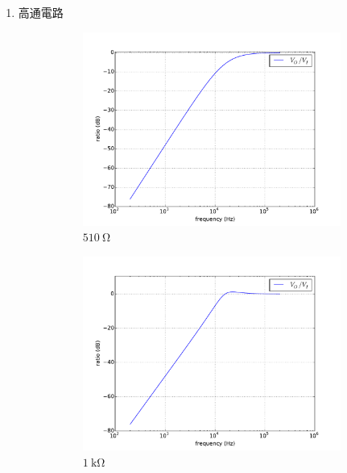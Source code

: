 \documentclass[12pt, a4paper]{article}
\begin{document}
\begin{enumerate}[itemsep=20pt, topsep=10pt]
\begin{enumerate}[label=(\alph*)]
      \item 高通電路  \begin{figure}[H]
        \centering
        \begin{subfigure}[b]{0.45\textwidth}
          \includegraphics[width=1\textwidth]{circuit/p21.pdf}
          \caption{$\SI{510}\ohm$}
        \end{subfigure}
        \begin{subfigure}[b]{0.45\textwidth}
          \includegraphics[width=1\textwidth]{circuit/p22.pdf}
          \caption{$\SI{1}\kohm$}
        \end{subfigure}
        \begin{subfigure}[b]{0.45\textwidth}

\end{subfigure}
\end{figure}
\end{enumerate}
\end{enumerate}
\end{document}
